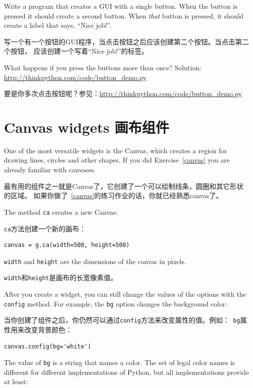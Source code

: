 \documentclass[10pt]{book}
\begin{document}
\begin{CJK}{UTF8}{gbsn}
\begin{exercise}

Write a program that creates a GUI with a single button.  When the
button is pressed it should create a second button.  When
{\em that} button is pressed, it should create a label that
says, ``Nice job!''.

写一个有一个按钮的GUI程序，当点击按钮之后应该创建第二个按钮。当点击第二个按钮，
应该创建一个写着``Nice job!''的标签。

What happens if you press the buttons more than once?
Solution: \url{http://thinkpython.com/code/button_demo.py}

要是你多次点击按钮呢？参见：\url{http://thinkpython.com/code/button_demo.py}

\end{exercise}


\section{Canvas widgets 画布组件}

One of the most versatile widgets is the Canvas, which creates
a region for drawing lines, circles and other shapes.  If you
did Exercise~\ref{canvas} you are already familiar with canvases.

最有用的组件之一就是Canvas了，它创建了一个可以绘制线条，圆圈和其它形状的区域。
如果你做了~\ref{canvas}的练习作业的话，你就已经熟悉canvas了。

The method {\tt ca} creates a new Canvas:

{\tt ca}方法创建一个新的画布：

\begin{verbatim}
canvas = g.ca(width=500, height=500)
\end{verbatim}
%
{\tt width} and {\tt height} are the dimensions of the canvas
in pixels.  

{\tt width}和{\tt height}是画布的长宽像素值。

After you create a widget, you can still change the values of
the options with the
{\tt config} method.  For example, the {\tt bg} option changes
the background color:

当你创建了组件之后，你仍然可以通过{\tt config}方法来改变属性的值。例如：{\tt
bg}属性用来改变背景颜色：

\begin{verbatim}
canvas.config(bg='white')
\end{verbatim}
%
The value of {\tt bg} is a string
that names a color.  The set of legal color names is different
for different implementations of Python, but all implementations
provide at least:


\end{CJK}
\end{document}
